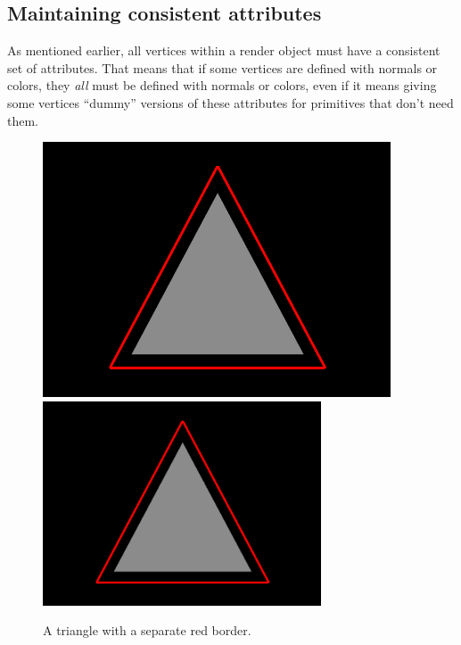 \subsection{Maintaining consistent attributes}

As mentioned earlier, all vertices within a render object must have a
consistent set of attributes. That means that if some vertices are
defined with normals or colors, they {\it all} must be defined with
normals or colors, even if it means giving some vertices ``dummy''
versions of these attributes for primitives that don't need them.

%
\begin{figure}[ht]
\begin{center}
\iflatexml
 \includegraphics[]{images/borderedTriangle}
\else
 \includegraphics[width=3.25in]{images/borderedTriangle}
\fi
\end{center}
\caption{A triangle with a separate red border.}
\label{borderedTriangle:fig}
\end{figure}
%

